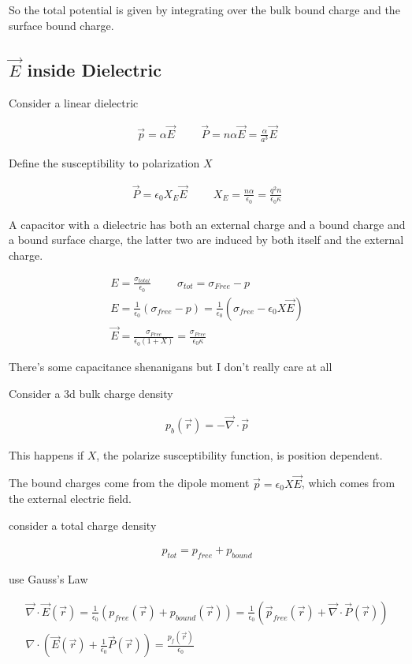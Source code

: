 \documentclass[fleqn]{report}
\newcommand{\hp}{\hspace{1cm}}
\newcommand{\equations} [1] {
\begin{gather*}
#1
\end{gather*}
}
\begin{document}
So the total potential is given by integrating over the bulk bound charge 
and the surface bound charge. 

\subsection{$\vec E$ inside Dielectric}
Consider a linear dielectric 

\equations{
    \vec p = \alpha \vec E 
    \hp 
    \vec P = n \alpha \vec E 
    =
    \frac{\alpha}{a^3} \vec E 
}
Define the susceptibility to polarization $X$ 
\equations{
    \vec P = \epsilon_0 X_E \vec E 
    \hp 
    X_E = \frac{n \alpha}{\epsilon_0}
    =
    \frac{q^2 n}{\epsilon_0 \kappa}
}

A capacitor with a dielectric has both an external charge and a bound 
charge and a bound surface charge, the latter two are induced by both itself 
and the external charge. 

\equations{
    E = \frac{\sigma_{total}}{\epsilon_0}
    \hp 
    \sigma_{tot} = \sigma_{Free} - p 
    \\
    E = \frac{1}{\epsilon_0}
    \left(
        \sigma_{free} - p
    \right)
    =
    \frac{1}{\epsilon_0}
    \left(
        \sigma_{free} - \epsilon_0 X \vec E 
    \right)
    \\
    \vec E 
    = 
    \frac{\sigma_{Free}}{\epsilon_0 (1 + X)}
    =
    \frac{\sigma_{Free}}{\epsilon_0 \kappa }
}

There's some capacitance shenanigans but I don't really care at all 

Consider a 3d bulk charge density 
\equations{
    p_b(\vec r) = - \vec \nabla \cdot \vec p 
}
This happens if $X$, the polarize susceptibility function, is position dependent. 

The bound charges come from the dipole moment $\vec p = \epsilon_0 X \vec E$, 
which comes from the external electric field. 

consider a total charge density 
\equations{
    p_{tot} = p_{free} + p_{bound}
}

use Gauss's Law 
\equations{
    \vec \nabla \cdot \vec E(\vec r)
    =
    \frac{1}{\epsilon_0}
    \left(
        p_{free}(\vec r) + p_{bound}(\vec r)
    \right)
    =
    \frac{1}{\epsilon_0}
    \left(
        \vec p_{free}(\vec r) + \vec \nabla \cdot \vec P(\vec r)
    \right)
    \\
    \nabla \cdot 
    \left(
        \vec E(\vec r) + \frac{1}{\epsilon_0} \vec P(\vec r)
    \right)
    =
    \frac{p_f(\vec r)}{\epsilon_0}
}
\end{document}
